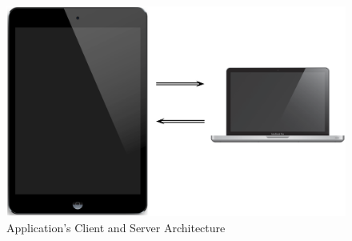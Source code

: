 \begin{figure}[htb]
	\centering
	
	\includegraphics[scale=0.2]{graphs/images/client_server_illu.pdf}
	\caption{Application's Client and Server Architecture}
	\label{fig:clientserver}

\end{figure}